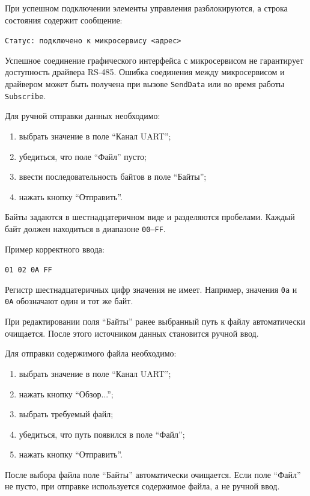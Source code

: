 При успешном подключении элементы управления разблокируются, а строка
состояния содержит сообщение:

\begin{center}
	\texttt{Статус: подключено к микросервису <адрес>}
\end{center}

Успешное соединение графического интерфейса с микросервисом не гарантирует
доступность драйвера RS-485. Ошибка соединения между микросервисом и драйвером
может быть получена при вызове \texttt{SendData} или во время работы
\texttt{Subscribe}.

Для ручной отправки данных необходимо:

\begin{enumerate}
	\item выбрать значение в поле ``Канал UART'';
	\item убедиться, что поле ``Файл'' пусто;
	\item ввести последовательность байтов в поле ``Байты'';
	\item нажать кнопку ``Отправить''.
\end{enumerate}

Байты задаются в шестнадцатеричном виде и разделяются пробелами. Каждый байт
должен находиться в диапазоне \texttt{00--FF}.

Пример корректного ввода:

\begin{center}
	\texttt{01 02 0A FF}
\end{center}

Регистр шестнадцатеричных цифр значения не имеет. Например, значения
\texttt{0a} и \texttt{0A} обозначают один и тот же байт.

При редактировании поля ``Байты'' ранее выбранный путь к файлу автоматически
очищается. После этого источником данных становится ручной ввод.

Для отправки содержимого файла необходимо:

\begin{enumerate}
	\item выбрать значение в поле ``Канал UART'';
	\item нажать кнопку ``Обзор...'';
	\item выбрать требуемый файл;
	\item убедиться, что путь появился в поле ``Файл'';
	\item нажать кнопку ``Отправить''.
\end{enumerate}

После выбора файла поле ``Байты'' автоматически очищается. Если поле ``Файл''
не пусто, при отправке используется содержимое файла, а не ручной ввод.

